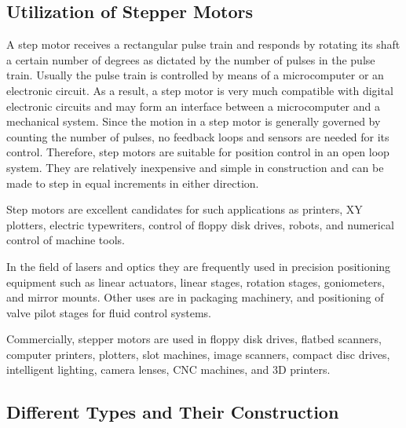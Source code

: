 \documentclass[journal]{IEEEtran}
\begin{document}
\subsection{Utilization of Stepper Motors}


A step motor receives a rectangular pulse train and responds by rotating its shaft a certain number of degrees as dictated by the number of pulses in the pulse train. Usually the pulse train is controlled by means of a microcomputer or an electronic circuit. As a result, a step motor is very much compatible with digital electronic circuits and may form an interface between a microcomputer and a mechanical system. 
Since the motion in a step motor is generally governed by counting the number of pulses, no feedback loops and sensors are needed for its control. Therefore, step motors are suitable for position control in an open loop system. They are relatively inexpensive and simple in construction and can be made to step in equal increments in either direction. \cite{guru2007}

Step motors are excellent candidates for such applications as printers, XY plotters, electric typewriters, control of floppy disk drives, robots, and numerical control of machine tools. \cite{guru2007}


In the field of lasers and optics they are frequently used in precision positioning equipment such as linear actuators, linear stages, rotation stages, goniometers, and mirror mounts. Other uses are in packaging machinery, and positioning of valve pilot stages for fluid control systems.\cite{wikipedia_stepper}

Commercially, stepper motors are used in floppy disk drives, flatbed scanners, computer printers, plotters, slot machines, image scanners, compact disc drives, intelligent lighting, camera lenses, CNC machines, and 3D printers.\cite{wikipedia_stepper}



\subsection{Different Types and Their Construction}
\end{document}
